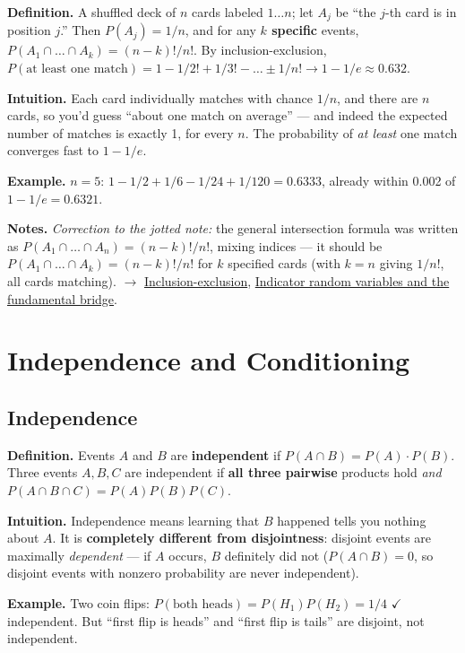 \documentclass[11pt,a4paper]{article}
\begin{document}
\textbf{Definition.} A shuffled deck of $n$ cards labeled $1\ldots n$; let $A_j$ be ``the $j$-th card is in position $j$.'' Then $P(A_j) = 1/n$, and for any \textbf{$k$ specific} events, $P(A_1 \cap  \ldots  \cap  A_k) = (n-k)! / n!$. By inclusion-exclusion,
$P(\text{at least one match}) = 1 - 1/2! + 1/3! - \ldots  \pm  1/n! \to  1 - 1/e \approx  0.632$.

\textbf{Intuition.} Each card individually matches with chance $1/n$, and there are $n$ cards, so you'd guess ``about one match on average'' --- and indeed the expected number of matches is exactly 1, for every $n$. The probability of \textit{at least} one match converges fast to $1 - 1/e$.

\textbf{Example.} $n = 5$: $1 - 1/2 + 1/6 - 1/24 + 1/120 = 0.6333$, already within 0.002 of $1 - 1/e = 0.6321$.

\textbf{Notes.} \textit{Correction to the jotted note:} the general intersection formula was written as $P(A_1 \cap  \ldots  \cap  A_n) = (n-k)!/n!$, mixing indices --- it should be \textbf{$P(A_1 \cap  \ldots  \cap  A_k) = (n-k)!/n!$} for $k$ specified cards (with $k = n$ giving $1/n!$, all cards matching). $\to$ \hyperref[sec:inclusion-exclusion]{Inclusion-exclusion}, \hyperref[sec:indicator-random-variables-and-the-fundamental-bridge]{Indicator random variables and the fundamental bridge}.


\section{Independence and Conditioning}

\subsection{Independence}\label{sec:independence}

\textbf{Definition.} Events $A$ and $B$ are \textbf{independent} if $P(A \cap  B) = P(A)\cdot P(B)$. Three events $A, B, C$ are independent if \textbf{all three pairwise} products hold \textit{and} $P(A \cap  B \cap  C) = P(A)P(B)P(C)$.

\textbf{Intuition.} Independence means learning that $B$ happened tells you nothing about $A$. It is \textbf{completely different from disjointness}: disjoint events are maximally \textit{dependent} --- if $A$ occurs, $B$ definitely did not ($P(A \cap  B) = 0$, so disjoint events with nonzero probability are never independent).

\textbf{Example.} Two coin flips: $P(\text{both heads}) = P(H_{1})P(H_{2}) = 1/4$ $\checkmark$ independent. But ``first flip is heads'' and ``first flip is tails'' are disjoint, not independent.
\end{document}
